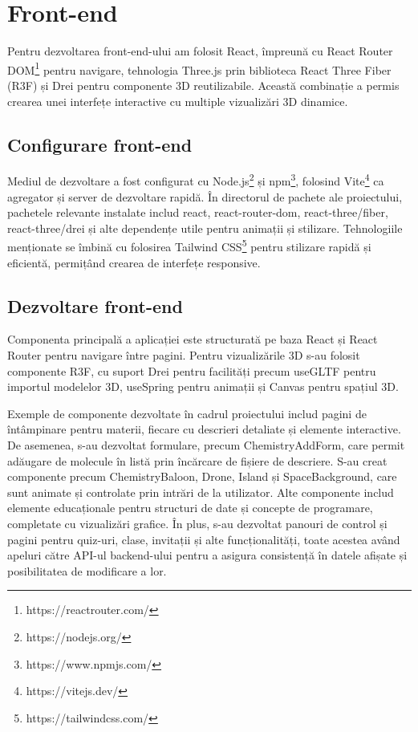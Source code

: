 \section{Front-end}
\label{sec:implementare-frontend}

Pentru dezvoltarea front-end-ului am folosit React, împreună cu React Router 
DOM\footnote{https://reactrouter.com/} pentru navigare,
tehnologia Three.js prin biblioteca React Three Fiber (R3F) și Drei pentru componente 3D reutilizabile.
Această combinație a permis crearea unei interfețe interactive cu multiple vizualizări 3D dinamice.

\subsection{Configurare front-end}
\label{subsec:implementare-frontend}

Mediul de dezvoltare a fost configurat cu Node.js\footnote{https://nodejs.org/} și 
npm\footnote{https://www.npmjs.com/}, folosind Vite\footnote{https://vitejs.dev/} ca agregator și server de dezvoltare rapidă.
În directorul de pachete ale proiectului, pachetele relevante instalate includ react, react-router-dom, 
react-three/fiber, react-three/drei și alte dependențe utile pentru animații și stilizare.
Tehnologiile menționate se îmbină cu folosirea Tailwind CSS\footnote{https://tailwindcss.com/} 
pentru stilizare rapidă și eficientă, permițând crearea de interfețe responsive. 

\subsection{Dezvoltare front-end}
\label{subsec:implementare-frontend}

Componenta principală a aplicației este structurată pe baza React și React Router pentru navigare între pagini.
Pentru vizualizările 3D s-au folosit componente R3F, cu suport Drei pentru facilități precum 
useGLTF pentru importul modelelor 3D, useSpring pentru animații și Canvas
pentru spațiul 3D.

Exemple de componente dezvoltate în cadrul proiectului includ pagini de întâmpinare
pentru materii, fiecare cu descrieri detaliate și
elemente interactive. De asemenea, s-au dezvoltat formulare,
precum ChemistryAddForm, care permit adăugare de molecule în listă prin încărcare
de fișiere de descriere. S-au creat componente
precum ChemistryBaloon, Drone, Island și SpaceBackground,
care sunt animate și controlate prin intrări de la utilizator. Alte componente includ elemente 
educaționale pentru structuri de date și concepte de programare, 
completate cu vizualizări grafice. În plus, s-au dezvoltat panouri de control și 
pagini pentru quiz-uri, clase, invitații și alte funcționalități, toate 
acestea având apeluri către API-ul backend-ului pentru a asigura consistență în 
datele afișate și posibilitatea de modificare a lor.

